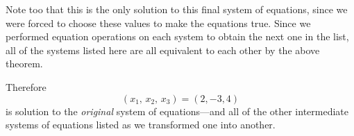 \documentclass{ximera}
\begin{document}
\begin{example}
\begin{question}
    Note too that this is the only solution to this final system of
    equations, since we were forced to choose these values to make the
    equations true.  Since we performed equation operations on each
    system to obtain the next one in the list, all of the systems listed
    here are all equivalent to each other by the above theorem.
  \end{question}

  \begin{question}
    Therefore \[
      (x_1,\,x_2,\,x_3)=(2,-3,4)
    \]
    is  solution to
    the \textit{original} system of equations---and all of the other
    intermediate systems of equations listed as we transformed one
    into another.
  \end{question}
\end{example}
\end{document}
